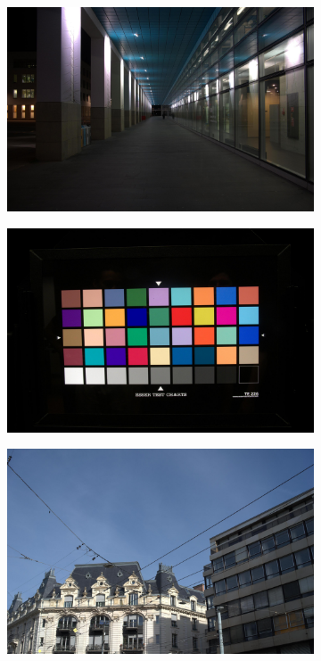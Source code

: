 \begin{figure}
    \begin{subfigure}[t]{.19\textwidth}
      \centering
      \includegraphics[width=\linewidth]{figures/digital1.jpeg}
    \end{subfigure}
    \hfill
    \begin{subfigure}[t]{.19\textwidth}
      \centering
      \includegraphics[width=\linewidth]{figures/digital2.jpeg}
    \end{subfigure}
    \hfill
    \begin{subfigure}[t]{.19\textwidth}
      \centering
      \includegraphics[width=\linewidth]{figures/digital3.jpeg}

\end{subfigure}
\end{figure}

